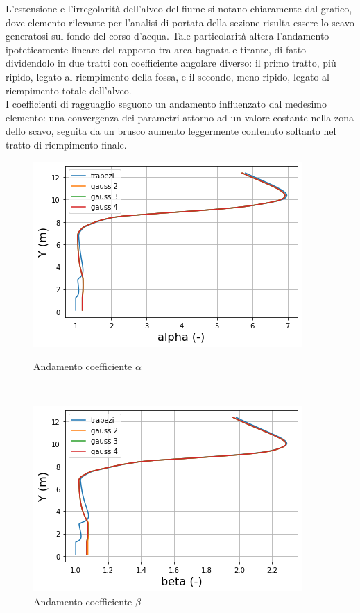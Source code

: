 \documentclass[12pt]{article} %
\begin{document}
\noindent L’estensione e l’irregolarità dell’alveo del fiume si notano chiaramente dal grafico, dove elemento rilevante per l’analisi di portata della sezione risulta essere lo scavo generatosi sul fondo del corso d’acqua. Tale particolarità altera l’andamento ipoteticamente lineare del rapporto tra area bagnata e tirante, di fatto dividendolo in due tratti con coefficiente angolare diverso: il primo tratto, più ripido, legato al riempimento della fossa, e il secondo, meno ripido, legato al riempimento totale dell’alveo.\\I coefficienti di ragguaglio seguono un andamento influenzato dal medesimo elemento: una convergenza dei parametri attorno ad un valore costante nella zona dello scavo, seguita da un brusco aumento leggermente contenuto soltanto nel tratto di riempimento finale.

\begin{figure}[H]
\begin{minipage}[b]{8.5cm}
\centering
    \includegraphics[width=1 \textwidth]{alphata.png}
    \caption{Andamento coefficiente $\alpha$}
    \label{fig:Tanaro_alfa}
\end{minipage}
\ \hspace{2mm} \hspace{3mm} \
\begin{minipage}[b]{8.5cm}
    \centering
    \includegraphics[width=1 \textwidth]{betata.png}
    \caption{Andamento coefficiente $\beta$}
    \label{fig:Tanaro_beta}
\end{minipage}
\end{figure}
\end{document}
